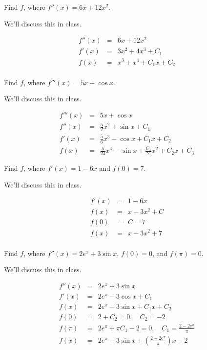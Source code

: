 \documentclass[12pt,addpoints, answers, fleqn]{exam}
\begin{document}
\begin{questions}
\question Find $f$, where $f''\left(x\right) = 6x+12x^2$.

\begin{solution}
We'll discuss this in class.

\begin{eqnarray*}
f''\left(x\right) &=& 6x+12x^2\\
f'\left(x\right) &=& 3x^2+4x^3+C_1\\
f\left(x\right) &=& x^3+x^4+C_1x + C_2\\
\end{eqnarray*}
\end{solution}

\question Find $f$, where $f'''\left(x\right) = 5x+\cos x$.

\begin{solution}
We'll discuss this in class.

\begin{eqnarray*}
f'''\left(x\right) &=& 5x+\cos x\\
f''\left(x\right) &=& \frac{5}{2}x^2+\sin x + C_1\\
f'\left(x\right) &=& \frac{5}{6}x^3-\cos x + C_1x+C_2\\
f\left(x\right) &=&  \frac{5}{24}x^4-\sin x + \frac{C_1}{2}x^2+C_2 x+ C_3
\end{eqnarray*}
\end{solution}

\question Find $f$, where $f'\left(x\right) = 1-6x$ and $f\left(0\right) = 7$.

\begin{solution}
We'll discuss this in class.

\begin{eqnarray*}
f'\left(x\right) &=& 1-6x\\
f\left(x\right) &=& x-3x^2 + C\\
f\left(0\right) &=& C = 7\\
f\left(x\right) &=& x-3x^2 + 7\\
\end{eqnarray*}
\end{solution}

\question Find $f$, where $f''\left( x \right) =2e^x + 3 \sin x$, $f\left(0\right) = 0$, and $f\left( \pi \right) = 0$.

\begin{solution}
We'll discuss this in class.

\begin{eqnarray*}
f''\left( x \right) &=&2e^x + 3 \sin x\\
f'\left( x \right) &=& 2e^x - 3 \cos x + C_1\\
f\left( x \right) &=& 2e^x - 3 \sin x + C_1x + C_2\\
f\left( 0 \right) &=& 2 + C_2 = 0, \quad C_2=-2\\
f\left( \pi \right) &=& 2e^{\pi}  + \pi C_1 - 2 = 0, \quad C_1 = \frac{2-2e^{\pi}}{\pi} \\
f\left( x \right) &=& 2e^x - 3 \sin x + \left(\frac{2-2e^{\pi}}{\pi} \right) x -2
\end{eqnarray*}
\end{solution}



\end{questions}
\end{document}
